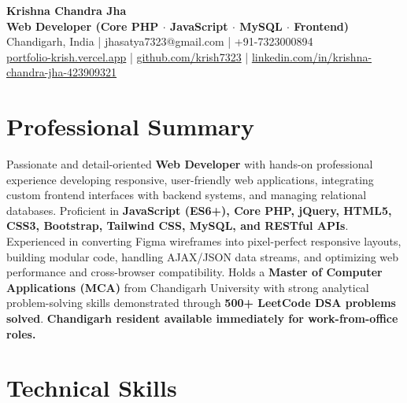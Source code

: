 \documentclass[a4paper,10pt]{article}
\begin{document}
\begin{center}

    {\LARGE \textbf{Krishna Chandra Jha}} \\[2.5pt]

    \textbf{Web Developer (Core PHP $\cdot$ JavaScript $\cdot$ MySQL $\cdot$ Frontend)} \\[3.5pt]

    Chandigarh, India
    \quad | \quad
    jhasatya7323@gmail.com
    \quad | \quad
    +91-7323000894
    \\[2.5pt]

    \href{https://portfolio-ashen-alpha-dv0whhsamo.vercel.app/}{portfolio-krish.vercel.app}
    \quad | \quad
    \href{https://github.com/krish7323}{github.com/krish7323}
    \quad | \quad
    \href{https://linkedin.com/in/krishna-chandra-jha-423909321}
    {linkedin.com/in/krishna-chandra-jha-423909321}

\end{center}

\section*{Professional Summary}

Passionate and detail-oriented \textbf{Web Developer} with hands-on professional experience developing responsive, user-friendly web applications, integrating custom frontend interfaces with backend systems, and managing relational databases. Proficient in \textbf{JavaScript (ES6+), Core PHP, jQuery, HTML5, CSS3, Bootstrap, Tailwind CSS, MySQL, and RESTful APIs}. Experienced in converting Figma wireframes into pixel-perfect responsive layouts, building modular code, handling AJAX/JSON data streams, and optimizing web performance and cross-browser compatibility. Holds a \textbf{Master of Computer Applications (MCA)} from Chandigarh University with strong analytical problem-solving skills demonstrated through \textbf{500+ LeetCode DSA problems solved}. \textbf{Chandigarh resident available immediately for work-from-office roles.}

\section*{Technical Skills}
\end{document}
